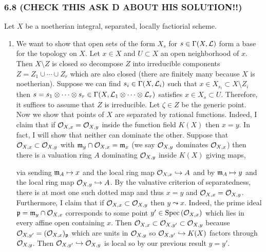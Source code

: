 \documentclass[12pt]{article}
\begin{document}
\subsubsection{6.8 (CHECK THIS ASK D ABOUT HIS SOLUTION!!)}

Let $X$ be a noetherian integral, separated, locally factiorial scheme.

\begin{enumerate}
\item We want to show that open sets of the form $X_s$ for $s \in \Gamma(X, \mathcal{L})$ form a base for the topology on $X$. Let $x \in X$ and $U \subset X$ an open neighborhood of $x$. Then $X \setminus Z$ is closed so decompose $Z$ into irreducible components $Z = Z_1 \cup \cdots \cup Z_r$ which are also closed (there are finitely many because $X$ is noetherian). Suppose we can find $s_i \in \Gamma(X, \mathcal{L}_i)$ such that $x \in X_{s_i} \subset X \setminus Z_i$ then $s = s_1 \otimes \cdots \otimes s_r \in \Gamma(X, \mathcal{L}_1 \otimes \cdots \otimes \mathcal{L}_r)$ satisfies $x \in X_s \subset U$. Therefore, it suffices to assume that $Z$ is irreducible. Let $\zeta \in Z$ be the generic point.
\bigskip\\
Now we show that points of $X$ are separated by rational functions. Indeed, I claim that if $\mathcal{O}_{X, x} = \mathcal{O}_{X, y}$ inside the function field $K(X)$ then $x = y$. In fact, I will show that neither can dominate the other. Suppose that $\mathcal{O}_{X, x} \subset \mathcal{O}_{X, y}$ with $\mathfrak{m}_y \cap \mathcal{O}_{X, x} = \mathfrak{m}_x$ (we say $\mathcal{O}_{X, y}$ dominates $\mathcal{O}_{X, x}$) then there is a valuation ring $A$ dominating $\mathcal{O}_{X, y}$ inside $K(X)$ giving maps,
\begin{center}
\end{center}
via sending $\mathfrak{m}_A \mapsto x$ and the local ring map $\mathcal{O}_{X, x} \hookrightarrow A$ and by $\mathfrak{m}_A \mapsto y$ and the local ring map $\mathcal{O}_{X, y} \hookrightarrow A$. By the valuative criterion of separatedness, there is at most one such dotted map and thus $x = y$ and $\mathcal{O}_{X, x} = \mathcal{O}_{X, y}$.
\bigskip\\
Furthermore, I claim that if $\mathcal{O}_{X, x} \subset \mathcal{O}_{X, y}$ then $y \leadsto x$. Indeed, the prime ideal $\mathfrak{p} = \mathfrak{m}_y \cap \mathcal{O}_{X, x}$ corresponds to some point $y' \in \mathrm{Spec}\left( \mathcal{O}_{X, x} \right)$ which lies in every affine open containing $x$. Then $\mathcal{O}_{X, x} \subset \mathcal{O}_{X, y'} \subset \mathcal{O}_{X, y}$ because $\mathcal{O}_{X, y'} = (\mathcal{O}_{X, x})_{\mathfrak{p}}$ which are units in $\mathcal{O}_{X, y}$ so $\mathcal{O}_{X, y'} \hookrightarrow K(X)$ factors through $\mathcal{O}_{X, y}$. Then $\mathcal{O}_{X, y'} \hookrightarrow \mathcal{O}_{X, y}$ is local so by our previous result $y = y'$.

\end{enumerate}
\end{document}
